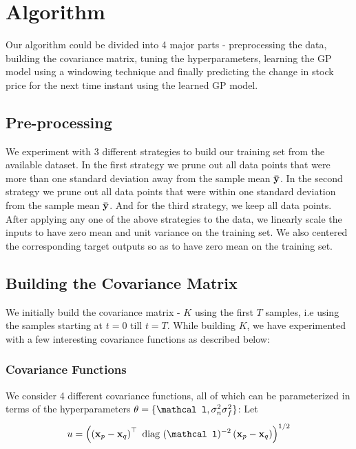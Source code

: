 \documentclass{article} %
\def\bfx{\mathbf x}
\def\bftheta{\mathbf \theta}
\def\bfl{\mathbf \mathcal l}
\def\diag{\mbox{ diag }}
\begin{document}


\section{Algorithm}

Our algorithm could be divided into 4 major parts - preprocessing the data, building the covariance matrix, tuning the hyperparameters, learning the GP model using a windowing technique and finally predicting the change in stock price for the next time instant using the learned GP model. 

\subsection{Pre-processing}

We experiment with 3 different strategies to build our training set from the available dataset. In the first strategy we prune out all data points that were more than one standard deviation away from the sample mean $\bf\bar{y}$. In the second strategy we prune out all data points that were within one standard deviation from the sample mean $\bf\bar{y}$. And for the third strategy, we keep all data points. After applying any one of the above strategies to the data, we linearly scale the inputs to have zero mean and unit variance on the training set. We also centered the corresponding target outputs so as to have zero mean on the training set.

\subsection{Building the Covariance Matrix}

We initially build the covariance matrix - $K$ using the first $T$ samples, i.e using the samples starting at $t = 0$ till $t = T$. While building $K$, we have experimented with a few interesting covariance functions as described below:  

\subsubsection{Covariance Functions}
We consider 4 different covariance functions, all of which can be parameterized in terms of the hyperparameters $\bftheta = \{\bfl, \sigma_n^2 \sigma_f^2\}$:
Let
\begin{equation}
	u = \left( \left( \bfx_p - \bfx_q \right)^\top \diag(\bfl)^{-2} \left( \bfx_p - \bfx_q \right) \right)^{1/2}
\end{equation}
\end{document}
